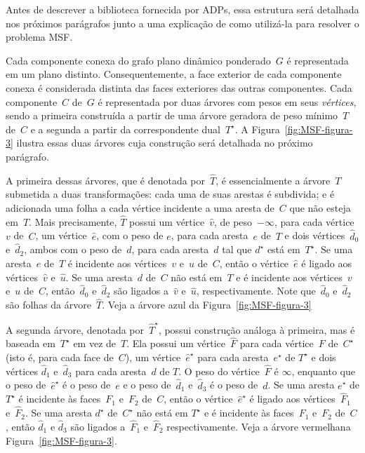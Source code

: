 
Antes de descrever a biblioteca fornecida por ADPs, essa estrutura será detalhada nos próximos parágrafos junto a uma explicação de como utilizá-la para resolver o problema MSF.

Cada componente conexa do grafo plano dinâmico ponderado~$G$ é representada em um plano distinto.
Consequentemente, a face exterior de cada componente conexa é considerada distinta das faces exteriores das outras componentes.
Cada componente~$C$ de~$G$ é representada por duas árvores com pesos em seus \textit{vértices}, sendo a primeira construída a partir de uma árvore geradora de peso mínimo~$T$ de~$C$ e a segunda a partir da correspondente dual~$T^\star$.
A Figura~\ref{fig:MSF-figura-3} ilustra essas duas árvores cuja construção será detalhada no próximo parágrafo.

A primeira dessas árvores, que é denotada por~$\hat T$, é essencialmente a árvore~$T$ submetida a duas transformações:
cada uma de suas arestas é subdivida; e é adicionada uma folha a cada vértice incidente a uma aresta de~$C$ que não esteja em~$T$.
Mais precisamente, $\hat T$ possui um vértice~$\hat v$, de peso~$-\infty$, para cada vértice~$v$ de~$C$, um vértice~$\hat e$, com o peso de $e$, para cada aresta~$e$ de~$T$ e dois vértices~$\hat d_0$ e~$\hat d_2$, ambos com o peso de~$d$, para cada aresta~$d$ tal que $d^\star$ está em~$T^\star$.
Se uma aresta~$e$ de~$T$ é incidente aos vértices~$v$ e~$u$ de~$C$, então o vértice~$\hat e$ é ligado aos vértices~$\hat v$ e~$\hat u$.
Se uma aresta~$d$ de~$C$ não está em~$T$ e é incidente aos vértices~$v$ e~$u$ de~$C$, então~$\hat d_0$ e~$\hat d_2$ são ligados a~$\hat v$ e~$\hat u$, respectivamente.
Note que~$\hat d_0$ e~$\hat d_2$ são folhas da árvore~$\hat T$.
Veja a árvore azul da Figura~\ref{fig:MSF-figura-3} 

A segunda árvore, denotada por~$\hat T^\star$, possui construção análoga à primeira, mas é baseada em~$T^\star$ em vez de~$T$.
Ela possui um vértice~$\hat F$ para cada vértice~$F$ de~$C^\star$ (isto é, para cada face de~$C$), um vértice~$\hat e^\star$ para cada aresta~$e^\star$ de $T^\star$ e dois vértices $\hat d_1$ e~$\hat d_3$ para cada aresta~$d$ de $T$.
O peso do vértice~$\hat F$ é $\infty$, enquanto que o peso de~$\hat e^\star$ é o peso de~$e$ e o peso de~$\hat d_1$ e~$\hat d_3$ é o peso de~$d$.
Se uma aresta $e^\star$ de $T^\star$ é incidente às faces~$F_1$ e~$F_2$ de~$C$, então o vértice~$\hat e^\star$ é ligado aos vértices~$\hat F_1$ e~$\hat F_2$.
Se uma aresta $d^\star$ de~$C^\star$ não está em $T^\star$ e é incidente às faces~$F_1$ e~$F_2$ de~$C$, então $\hat d_1$ e $\hat d_3$ são ligados a~$\hat F_1$ e~$\hat F_2$ respectivamente.
Veja a árvore vermelhana Figura~\ref{fig:MSF-figura-3}.

